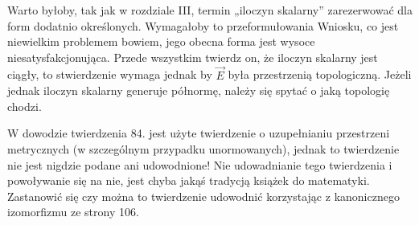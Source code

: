 \documentclass[a4paper,11pt]{article}
\begin{document}



\start {} Warto byłoby, tak jak w rozdziale III, termin
„iloczyn skalarny” zarezerwować dla form dodatnio określonych.
Wymagałoby to przeformułowania Wniosku, co jest niewielkim problemem
bowiem, jego obecna forma jest wysoce niesatysfakcjonująca. Przede
wszystkim twierdz on, że iloczyn skalarny jest ciągły, to stwierdzenie
wymaga jednak by $\vec{ E }$ była przestrzenią topologiczną. Jeżeli
jednak iloczyn skalarny generuje półnormę, należy się spytać o jaką
topologię chodzi.

\vspace{\spaceFour}


\start {} W dowodzie twierdzenia 84. jest użyte twierdzenie o
uzupełnianiu przestrzeni metrycznych (w szczególnym przypadku
unormowanych), jednak to twierdzenie nie jest nigdzie podane ani
udowodnione! Nie udowadnianie tego twierdzenia i powoływanie się na
nie, jest chyba jakąś tradycją książek do matematyki. Zastanowić się
czy można to twierdzenie udowodnić korzystając z kanonicznego
izomorfizmu ze strony 106.
\end{document}
